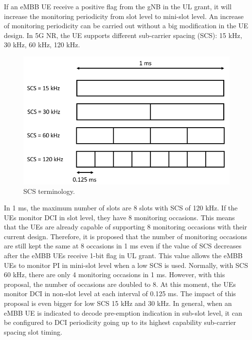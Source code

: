 \documentclass{ieeeaccess}
\begin{document}
If an eMBB UE receive a positive flag from the gNB in the UL grant, it will increase the monitoring periodicity from slot level to mini-slot level. An increase of monitoring periodicity can be carried out without a big modification in the UE design. In 5G NR, the UE supports different sub-carrier spacing (SCS): 15 kHz, 30 kHz, 60 kHz, 120 kHz. 

\begin{figure}[htbp]
\centerline{\includegraphics[scale=0.33]{fig9.PNG}}
\caption{SCS terminology.}
\label{fig9}
\end{figure}

In 1 ms, the maximum number of slots are 8 slots with SCS of 120 kHz. If the UEs monitor DCI in slot level, they have 8 monitoring occasions. This means that the UEs are already capable of supporting 8 monitoring occasions with their current design. Therefore, it is proposed that the number of monitoring occasions are still kept the same at 8 occasions in 1 ms even if the value of SCS decreases after the eMBB UEs receive 1-bit flag in UL grant. This value allows the eMBB UEs to monitor PI in mini-slot level when a low SCS is used. Normally, with SCS 60 kHz, there are only 4 monitoring occasions in 1 ms. However, with this proposal, the number of occasions are doubled to 8. At this moment, the UEs monitor DCI in non-slot level at each interval of 0.125 ms. The impact of this proposal is even bigger for low SCS 15 kHz and 30 kHz. In general, when an eMBB UE is indicated to decode pre-emption indication in sub-slot level, it can be configured to DCI periodicity going up to its highest capability sub-carrier spacing slot timing. 
\end{document}
